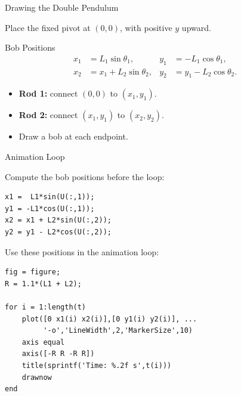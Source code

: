 \documentclass[10pt]{beamer}
\begin{document}
\begin{frame}{Drawing the Double Pendulum}

Place the fixed pivot at $(0,0)$, with positive $y$ upward.

\begin{block}{Bob Positions}
\[
\begin{aligned}
x_1 &= L_1\sin\theta_1,
& y_1 &= -L_1\cos\theta_1,\\
x_2 &= x_1+L_2\sin\theta_2,
& y_2 &= y_1-L_2\cos\theta_2.
\end{aligned}
\]
\end{block}

\begin{itemize}
    \item \textbf{Rod 1:} connect $(0,0)$ to $(x_1,y_1)$.
    \item \textbf{Rod 2:} connect $(x_1,y_1)$ to $(x_2,y_2)$.
    \item Draw a bob at each endpoint.
\end{itemize}



\end{frame}

\begin{frame}[fragile]{Animation Loop}

Compute the bob positions before the loop:

\begin{lstlisting}[basicstyle=\ttfamily\small]
x1 =  L1*sin(U(:,1));
y1 = -L1*cos(U(:,1));
x2 = x1 + L2*sin(U(:,2));
y2 = y1 - L2*cos(U(:,2));
\end{lstlisting}

Use these positions in the animation loop:

\begin{lstlisting}[basicstyle=\ttfamily\small]
fig = figure;
R = 1.1*(L1 + L2);

for i = 1:length(t)
    plot([0 x1(i) x2(i)],[0 y1(i) y2(i)], ...
         '-o','LineWidth',2,'MarkerSize',10)
    axis equal
    axis([-R R -R R])
    title(sprintf('Time: %.2f s',t(i)))
    drawnow
end
\end{lstlisting}


\end{frame}
\end{document}
